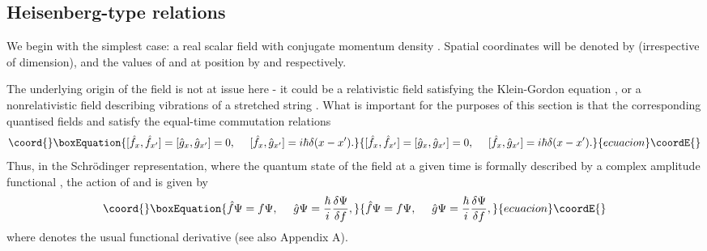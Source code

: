 \documentclass[a4paper,preprint, showpacs, aps, draft]{revtex4}
\begin{document}
{\subsection{Heisenberg-type relations}

We begin with the simplest case: a real scalar field \coordHE{} with conjugate
momentum density \coordHE{}. Spatial coordinates will be denoted by \coordHE{}
(irrespective of dimension), and the values of \coordHE{} and \coordHE{} at position
\coordHE{} by \coordHE{} and \coordHE{} respectively.  

The underlying origin of the field is not
at issue here - it could be a relativistic field satisfying the
Klein-Gordon equation \cite{brown}, or a nonrelativistic field
describing vibrations of a stretched string \cite{goldstein}.  What
is important for the purposes of this section is that the corresponding
quantised fields \coordHE{} and \coordHE{} satisfy the equal-time
commutation relations \cite{brown}
\begin{equation}\coord{}\boxEquation{ \label{comm}
[\hat{f}_x , \hat{f}_{x'}] = [\hat{g}_x , \hat{g}_{x'}] = 0,~~~~
[\hat{f}_x ,\hat{g}_{x'}] = i\hbar\delta(x-x') . 
}{ [\hat{f}_x , \hat{f}_{x'}] = [\hat{g}_x , \hat{g}_{x'}] = 0,~~~~
[\hat{f}_x ,\hat{g}_{x'}] = i\hbar\delta(x-x') . 
}{ecuacion}\coordE{}\end{equation}
Thus, in the Schr\"{o}dinger representation, where the
quantum state of the field at a given time
is formally described by a complex amplitude
functional \myHighlight{$\Psi[f]$}\coordHE{}, the action of \coordHE{} and \coordHE{} is given by
\cite{schweber}
\begin{equation}\coord{}\boxEquation{ \label{srep}
\hat{f} \Psi = f \Psi,~~~~\hat{g} \Psi =
\frac{\hbar}{i}\frac{\delta\Psi}{\delta f} ,
}{ \hat{f} \Psi = f \Psi,~~~~\hat{g} \Psi =
\frac{\hbar}{i}\frac{\delta\Psi}{\delta f} ,
}{ecuacion}\coordE{}\end{equation}
where \coordHE{} denotes the usual functional derivative (see
also Appendix A).

}
\end{document}
